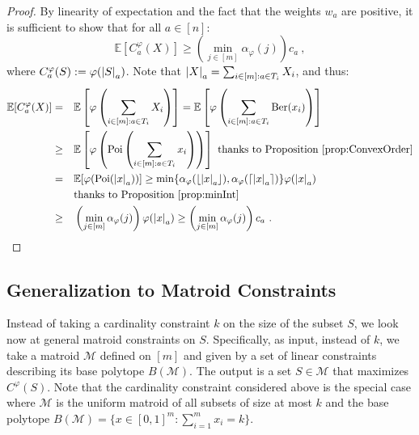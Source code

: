 \begin{proof}
  By linearity of expectation and the fact that the weights $w_a$ are positive, it is sufficient to show that for all $a \in [n]$:
  \[ \mathbb{E}[C_a^{\varphi}(X)] \geq \left(\min_{j \in [m]} \alpha_{\varphi}(j) \right) c_a \ , \]
 where $C_a^{\varphi}(S) := \varphi(\abs{S}_a)$. Note that $\abs{X}_a = \sum_{i \in [m] : a \in T_i} X_i$, and thus:
  \begin{equation}
    \begin{aligned}
      \mathbb{E}[C_a^{\varphi}(X)] &=&& \mathbb{E}\left[\varphi\left(\sum_{i \in [m] : a \in T_i} X_i\right)\right] = \mathbb{E}\left[\varphi\left(\sum_{i \in [m] : a \in T_i}\operatorname{\text{Ber}}(x_i) \right)\right]\\
      &\geq&& \mathbb{E}\left[\varphi\left(\operatorname{\text{Poi}}\left(\sum_{i \in [m] : a \in T_i} x_i\right)\right)\right] \text{ thanks to Proposition~\ref{prop:ConvexOrder}}\\
      &=&& \mathbb{E}[\varphi(\operatorname{\text{Poi}}(\abs{x}_a))] \geq \min \{ \alpha_{\varphi}(\lfloor \abs{x}_a \rfloor), \alpha_{\varphi}(\lceil \abs{x}_a \rceil) \} \varphi(\abs{x}_a)\\
      &\quad&& \text{thanks to Proposition~\ref{prop:minInt}}\\
      &\geq&& \left(\min_{j \in [m]} \alpha_{\varphi}(j) \right) \varphi(\abs{x}_a) \geq \left(\min_{j \in [m]} \alpha_{\varphi}(j) \right) c_a\ .
    \end{aligned}
  \end{equation}

\end{proof}

\subsection{Generalization to Matroid Constraints}
\label{sec:matroid}

Instead of taking a cardinality constraint $k$ on the size of the subset $S$, we look now at general matroid constraints on $S$. Specifically, as input, instead of $k$, we take a matroid $\mathcal{M}$ defined on $[m]$ and given by a set of linear constraints describing its base polytope $B(\mathcal{M})$. The output is a set $S \in \mathcal{M}$ that maximizes $C^{\varphi}(S)$. Note that the cardinality constraint considered above is the special case where $\mathcal{M}$ is the uniform matroid of all subsets of size at most $k$ and the base polytope $B(\mathcal{M}) = \{ x \in [0,1]^m : \sum_{i=1}^m x_i = k\}$.

